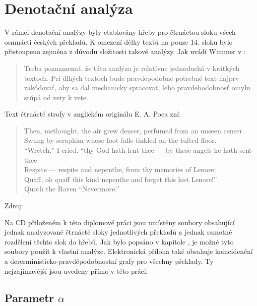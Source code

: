 \documentclass[dp.tex]{subfiles}
\begin{document}
\section{Denotační analýza}
\label{chap:denotation-analysis} 

V rámci denotační analýzy byly etablovány hřeby pro čtrnáctou sloku všech osmnácti českých překladů. K omezení délky textů na pouze 14. sloku bylo přistoupeno zejména z důvodu složitosti takové analýzy. Jak uvádí Wimmer v \cite[str.~300]{Wimmer2003}: 

\begin{quote}
Treba poznamenať, že táto analýza je relatívne jednoduchá v krátkých textoch. Pri dlhých textoch bude pravdepodobne potrebné text najprv zakódovať, aby sa dal mechanicky spracovať, lebo pravdebodobnosť omylu stúpá od vety k vete.
\end{quote}

Text čtrnácté strofy v anglickém originálu E. A. Poea zní:

\begin{verse}
 Then, methought, the air grew denser, perfumed from an unseen censer \\
 Swung by seraphim whose foot-falls tinkled on the tufted floor.\\
 “Wretch,” I cried, “thy God hath lent thee — by these angels he hath sent thee \\
 Respite — respite and nepenthe, from thy memories of Lenore; \\
 Quaff, oh quaff this kind nepenthe and forget this lost Lenore!”\\
 Quoth the Raven “Nevermore.” 
\end{verse}
\begin{flushright}
Zdroj: \cite[str.~65]{Poe1990}
\end{flushright}

Na CD přiloženém k této diplomové práci jsou umístěny soubory obsahující jednak analyzované čtrnácté sloky jednotlivých překladů a jednak samotné rozdělení těchto slok do hřebů. Jak bylo popsáno v kapitole , je možné tyto soubory použít k vlastní analýze. Elektronická příloha také obsahuje koincidenční a dererministicko-pravděpodobnostní grafy pro všechny překlady. Ty nejzajímavější jsou uvedeny přímo v této práci.

\subsection{Parametr $\alpha$}
\end{document}
